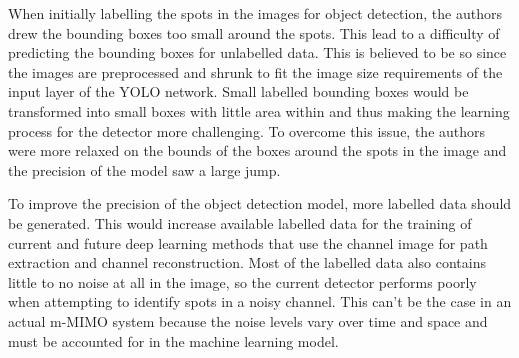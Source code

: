 When initially labelling the spots in the images for object detection, the authors drew the bounding boxes too small around the spots. This lead to a difficulty of predicting the bounding boxes for unlabelled data. This is believed to be so since the images are preprocessed and shrunk to fit the image size requirements of the input layer of the YOLO network. Small labelled bounding boxes would be transformed into small boxes with little area within and thus making the learning process for the detector more challenging. To overcome this issue, the authors were more relaxed on the bounds of the boxes around the spots in the image and the precision of the model saw a large jump.

To improve the precision of the object detection model, more labelled data should be generated. This would increase available labelled data for the training of current and future deep learning methods that use the channel image for path extraction and channel reconstruction. Most of the labelled data also contains little to no noise at all in the image, so the current detector performs poorly when attempting to identify spots in a noisy channel. This can't be the case in an actual m-MIMO system because the noise levels vary over time and space and must be accounted for in the machine learning model.